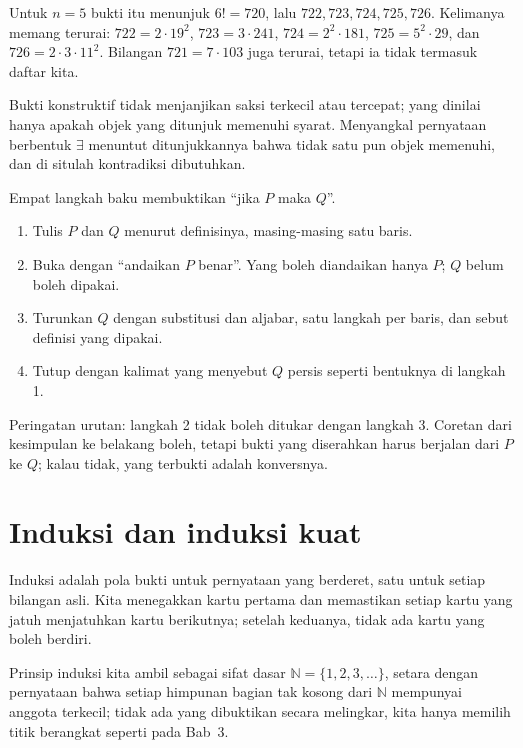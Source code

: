 Untuk $n = 5$ bukti itu menunjuk $6! = 720$, lalu $722, 723, 724, 725, 726$. Kelimanya
memang terurai: $722 = 2 \cdot 19^{2}$, $723 = 3 \cdot 241$, $724 = 2^{2} \cdot 181$,
$725 = 5^{2} \cdot 29$, dan $726 = 2 \cdot 3 \cdot 11^{2}$. Bilangan $721 = 7 \cdot 103$ juga terurai, tetapi ia tidak termasuk daftar kita.

Bukti konstruktif tidak menjanjikan saksi terkecil atau tercepat; yang dinilai hanya
apakah objek yang ditunjuk memenuhi syarat. Menyangkal pernyataan berbentuk $\exists$
menuntut ditunjukkannya bahwa tidak satu pun objek memenuhi, dan di situlah kontradiksi
dibutuhkan.

\begin{resep}
Empat langkah baku membuktikan ``jika $P$ maka $Q$''.
\begin{enumerate}
  \item Tulis $P$ dan $Q$ menurut definisinya, masing-masing satu baris.
  \item Buka dengan ``andaikan $P$ benar''. Yang boleh diandaikan hanya $P$; $Q$ belum
        boleh dipakai.
  \item Turunkan $Q$ dengan substitusi dan aljabar, satu langkah per baris, dan sebut
        definisi yang dipakai.
  \item Tutup dengan kalimat yang menyebut $Q$ persis seperti bentuknya di langkah 1.
\end{enumerate}
Peringatan urutan: langkah 2 tidak boleh ditukar dengan langkah 3. Coretan dari kesimpulan
ke belakang boleh, tetapi bukti yang diserahkan harus berjalan dari $P$ ke $Q$; kalau
tidak, yang terbukti adalah konversnya.
\end{resep}

\section{Induksi dan induksi kuat}

Induksi adalah pola bukti untuk pernyataan yang berderet, satu untuk setiap bilangan
asli. Kita menegakkan kartu pertama dan memastikan setiap kartu yang jatuh menjatuhkan
kartu berikutnya; setelah keduanya, tidak ada kartu yang boleh berdiri.


Prinsip induksi kita ambil sebagai sifat dasar $\mathbb{N} = \{1,2,3,\dots\}$, setara
dengan pernyataan bahwa setiap himpunan bagian tak kosong dari $\mathbb{N}$ mempunyai
anggota terkecil; tidak ada yang dibuktikan secara melingkar, kita hanya memilih titik
berangkat seperti pada Bab~3.

